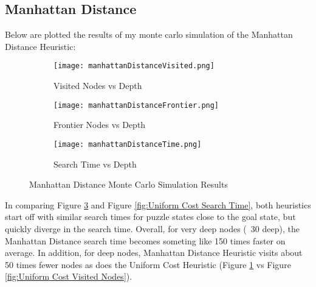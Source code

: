 \documentclass{article}
\begin{document}
\subsection{Manhattan Distance}
Below are plotted the results of my monte carlo simulation of the Manhattan Distance Heuristic:
\begin{figure}[h]
	\centering
	\begin{subfigure}[b]{0.32\textwidth}
		\centering
		\texttt{[image: manhattanDistanceVisited.png]}
		\caption{Visited Nodes vs Depth}
		\label{fig:Manhattan Distance Visited Nodes}
	\end{subfigure}
	\hfill
	\begin{subfigure}[b]{0.32\textwidth}
		\centering
		\texttt{[image: manhattanDistanceFrontier.png]}
		\caption{Frontier Nodes vs Depth}
		\label{fig:Manhattan Distance Frontier Nodes}
	\end{subfigure}
	\hfill
	\begin{subfigure}[b]{0.32\textwidth}
		\centering
		\texttt{[image: manhattanDistanceTime.png]}
		\caption{Search Time vs Depth}
		\label{fig:Manhattan Distance Search Time}
	\end{subfigure}
	\caption{Manhattan Distance Monte Carlo Simulation Results}
	\label{fig:Manhattan Distance Monte Carlo Simulation}
\end{figure}
\par In comparing Figure \ref{fig:Manhattan Distance Search Time} and Figure \ref{fig:Uniform Cost Search Time}, both heuristics start off with similar search times for puzzle states close to the goal state, but quickly diverge in the search time. Overall, for very deep nodes (~30 deep), the Manhattan Distance search time becomes someting like 150 times faster on average. In addition, for deep nodes, Manhattan Distance Heuristic visits about 50 times fewer nodes as does the Uniform Cost Heuristic (Figure \ref{fig:Manhattan Distance Visited Nodes} vs Figure \ref{fig:Uniform Cost Visited Nodes}).
\end{document}
